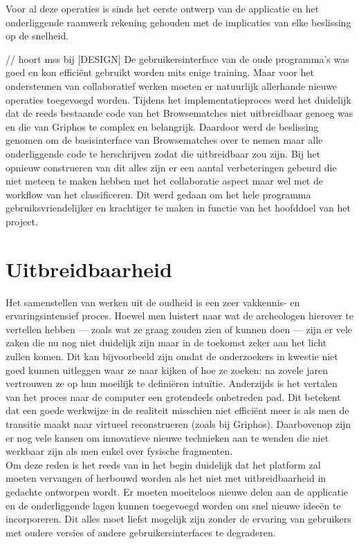 Voor al deze operaties is sinds het eerste ontwerp van de applicatie en het onderliggende raamwerk rekening gehouden met de implicaties van elke beslissing op de snelheid.

// hoort mss bij [DESIGN]
De gebruikersinterface van de oude programma's was goed en kon effici\"ent gebruikt worden mits enige training. Maar voor het ondersteunen van collaboratief werken moeten er natuurlijk allerhande nieuwe operaties toegevoegd
worden. Tijdens het implementatieproces werd het duidelijk dat de reeds bestaande code van het Browsematches niet uitbreidbaar genoeg was en die van Griphos te complex en belangrijk. Daardoor werd de beslissing genomen om de
basisinterface van Browsematches over te nemen maar alle onderliggende code te herschrijven zodat die uitbreidbaar zou zijn. Bij het opnieuw construeren van dit alles zijn er een aantal verbeteringen gebeurd die niet meteen te maken hebben met het collaboratie aspect maar wel met de workflow van het classificeren. Dit werd gedaan om het hele programma gebruiksvriendelijker en krachtiger te maken in functie van het hoofddoel van het project.

\section{Uitbreidbaarheid}
Het samenstellen van werken uit de oudheid is een zeer vakkennis- en ervaringsintensief proces. Hoewel men luistert naar wat de archeologen hierover te vertellen hebben --- zoals wat ze graag zouden zien of kunnen doen --- zijn er vele zaken die nu nog niet duidelijk zijn maar in de toekomst zeker aan het licht zullen komen. Dit kan bijvoorbeeld zijn omdat de onderzoekers in kwestie niet goed kunnen uitleggen waar ze naar kijken of hoe ze zoeken: na zovele jaren vertrouwen ze op hun moeilijk te defini\"eren intu\"itie. Anderzijds is het vertalen van het proces naar de computer een grotendeels onbetreden pad. Dit betekent dat een goede werkwijze in de realiteit misschien niet effici\"ent meer is als men de transitie maakt naar virtueel reconstrueren (zoals bij Griphos). Daarbovenop zijn er nog vele kansen om innovatieve nieuwe technieken aan te wenden die niet werkbaar zijn als men enkel over fysische fragmenten.\\

Om deze reden is het reeds van in het begin duidelijk dat het platform zal moeten vervangen of herbouwd worden als het niet met uitbreidbaarheid in gedachte ontworpen wordt. Er moeten moeiteloos nieuwe delen aan de applicatie en de onderliggende lagen kunnen toegevoegd worden om snel nieuwe idee\"en te incorporeren. Dit alles moet liefst mogelijk zijn zonder de ervaring van gebruikers met oudere versies of andere gebruikersinterfaces te degraderen.

